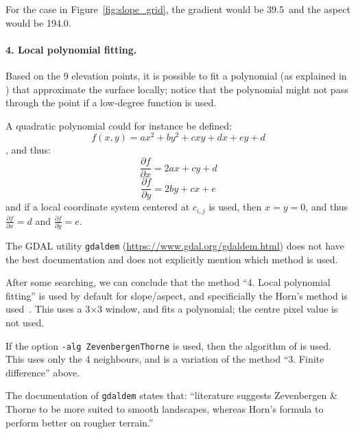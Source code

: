 For the case in Figure~\ref{fig:slope_grid}, the gradient would be 39.5\degree\ and the aspect would be 194.0\degree.


\paragraph{4. Local polynomial fitting.}%
\label{sec:polynomial}

Based on the 9 elevation points, it is possible to fit a polynomial (as explained in ) that approximate the surface locally; notice that the polynomial might not pass through the point if a low-degree function is used.

A quadratic polynomial could for instance be defined:
\begin{equation}
  f(x,y) = ax^2 + by^2 + cxy + dx + ey +d
\end{equation}
, and thus:
\begin{equation}
  \frac{\partial f}{\partial x} = 2ax + cy + d
\end{equation}
\begin{equation}
  \frac{\partial f}{\partial y} = 2by + cx + e
\end{equation}
and if a local coordinate system centered at $c_{i,j}$ is used, then $x = y = 0$, and thus $\frac{\partial f}{\partial x} = d$ and $\frac{\partial f}{\partial y} = e$.


\begin{kaobox-practice}[frametitle=\faCog\ How does it work in practice?]
  The GDAL utility \texttt{gdaldem} (\url{https://www.gdal.org/gdaldem.html}) does not have the best documentation and does not explicitly mention which method is used.

  After some searching, we can conclude that the method ``4. Local polynomial fitting'' is used by default for slope/aspect, and specificially the Horn's method is used~\citep{Horn81}.
  This uses a 3$\times$3 window, and fits a polynomial; the centre pixel value is not used.

  If the option \texttt{-alg ZevenbergenThorne} is used, then the algorithm of \citet{Zevenbergen87} is used. 
  This uses only the 4 neighbours, and is a variation of the method ``3. Finite difference'' above.

  The documentation of \texttt{gdaldem} states that: ``literature suggests Zevenbergen \& Thorne to be more suited to smooth landscapes, whereas Horn's formula to perform better on rougher terrain.''
\end{kaobox-practice}


